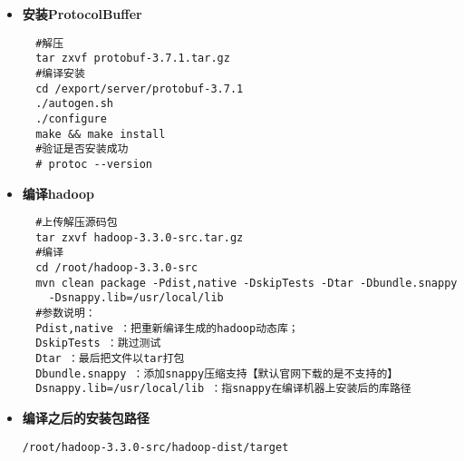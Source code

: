 \documentclass[bachelor]{thesis-uestc}
\begin{document}
\begin{itemize}
\item \textbf{安装ProtocolBuffer}
\begin{verbatim}
  #解压
  tar zxvf protobuf-3.7.1.tar.gz
  #编译安装
  cd /export/server/protobuf-3.7.1
  ./autogen.sh
  ./configure
  make && make install
  #验证是否安装成功
  # protoc --version
\end{verbatim}

\item \textbf{编译hadoop}
\begin{verbatim}
  #上传解压源码包
  tar zxvf hadoop-3.3.0-src.tar.gz
  #编译
  cd /root/hadoop-3.3.0-src
  mvn clean package -Pdist,native -DskipTests -Dtar -Dbundle.snappy
    -Dsnappy.lib=/usr/local/lib
  #参数说明：
  Pdist,native ：把重新编译生成的hadoop动态库；
  DskipTests ：跳过测试
  Dtar ：最后把文件以tar打包
  Dbundle.snappy ：添加snappy压缩支持【默认官网下载的是不支持的】
  Dsnappy.lib=/usr/local/lib ：指snappy在编译机器上安装后的库路径
\end{verbatim}

\item \textbf{编译之后的安装包路径}
\begin{verbatim}
/root/hadoop-3.3.0-src/hadoop-dist/target
\end{verbatim}
\end{itemize}
\end{document}
